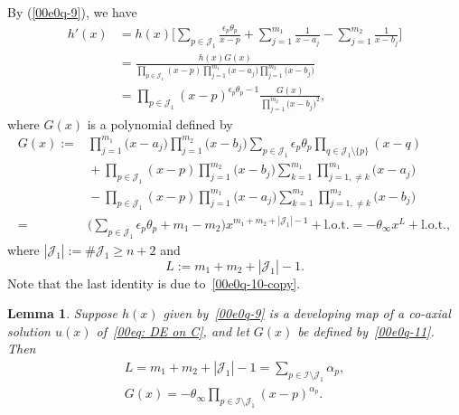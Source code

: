 \documentclass[pdftex]{sigma}
\numberwithin{equation}{section}
\newtheorem{Lemma}[Theorem]{Lemma}
\begin{document}
By (\ref{00e0q-9}), we have
{\allowdisplaybreaks
\begin{align}\label{00e0q-11-copy}
h'(x)&=h(x)\Bigg[\sum_{p\in \mathcal{J}_1}\frac{\epsilon_{p}\theta_{p}}{x-p}
+\sum_{j=1}^{m_1}\frac{1}{x-a_j}-\sum_{j=1}^{m_2}\frac{1}{x-b_j}\Bigg]\nonumber\\
&=\frac{h(x)G(x)}{\prod_{p\in\mathcal{J}_1}(x-p)\prod_{j=1}^{m_1}\bigl(x-a_j\bigr)\prod_{j=1}^{m_2}\bigl(x-b_j\bigr)}\nonumber\\
&=\prod_{p\in \mathcal{J}_1}(x-p)^{\epsilon_{p}\theta_{p}-1}\frac{G(x)}{\prod_{j=1}^{m_2}\bigl(x-b_j\bigr)^2},
\end{align}
}%
where $G(x)$ is a polynomial defined by
{\allowdisplaybreaks
\begin{align}
G(x):={}&%
\prod_{j=1}^{m_1}\bigl(x-a_j\bigr)\prod_{j=1}^{m_2}\bigl(x-b_j\bigr)\sum_{p\in \mathcal{J}_1}\epsilon_{p}\theta_{p}\prod_{q\in\mathcal{J}_1\setminus\{p\}}(x-q)\nonumber\\
&{}+\prod_{p\in \mathcal{J}_1}(x-p)\prod_{j=1}^{m_2}\bigl(x-b_j\bigr)\sum_{k=1}^{m_1}\prod_{j=1,\neq k}^{m_1}\bigl(x-a_j\bigr)\nonumber\\
&{}-\prod_{p\in \mathcal{J}_1}(x-p)\prod_{j=1}^{m_1}\bigl(x-a_j\bigr)\sum_{k=1}^{m_2}\prod_{j=1,\neq k}^{m_2}\bigl(x-b_j\bigr)\nonumber\\
={}&\biggl(\sum_{p\in \mathcal{J}_1}\epsilon_{p}\theta_{p}+m_1-m_2\biggr)x^{m_1+m_2+|\mathcal{J}_1|-1}+\text{l.o.t.}
= -\theta_{\infty}x^{L}+\text{l.o.t.},\label{00e0q-11}
\end{align}
}%
where $|\mathcal{J}_1|:=\#\mathcal{J}_1\geq n+2$ and
\begin{equation*}
L:=m_1+m_2+|\mathcal{J}_1|-1.
\end{equation*}
Note that the last identity is due to~\eqref{00e0q-10-copy}.

\begin{Lemma}
Suppose $h(x)$ given by~\eqref{00e0q-9} is a developing map of a co-axial solution $u(x)$ of~\eqref{00eq: DE on C}, and let $G(x)$ be defined by~\eqref{00e0q-11}. Then
\begin{gather}
\label{00e0q-13-copy}L=m_1+m_2+|\mathcal{J}_1|-1=\sum_{p\in \mathcal{I}\setminus\mathcal{J}_1}{\alpha}_{p},\\
\label{00e0q-12-copy}G(x)=-\theta_\infty \prod_{p\in\mathcal{I}\setminus \mathcal{J}_1}(x-p)^{{\alpha}_{p}}.
\end{gather}
\end{Lemma}
\end{document}
